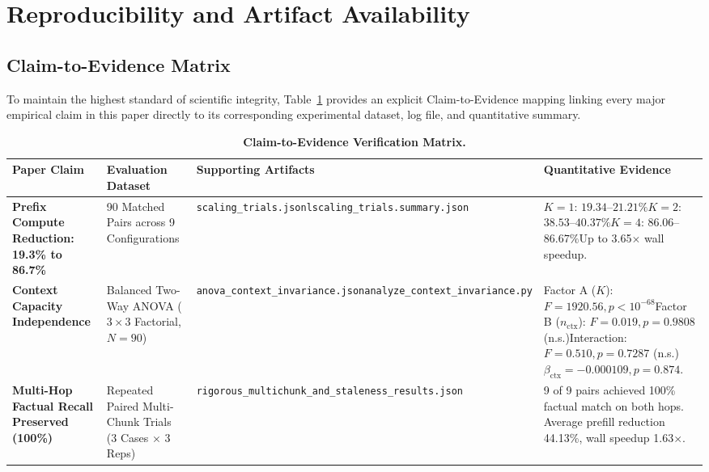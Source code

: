\section{Reproducibility and Artifact Availability}
\label{sec:reproducibility}

\subsection{Claim-to-Evidence Matrix}
To maintain the highest standard of scientific integrity, Table~\ref{tab:claim_matrix} provides an explicit Claim-to-Evidence mapping linking every major empirical claim in this paper directly to its corresponding experimental dataset, log file, and quantitative summary.

\begin{table}[t]
\centering
\caption{\textbf{Claim-to-Evidence Verification Matrix.}}
\label{tab:claim_matrix}
\small
\begin{tabular}{p{3.8cm}p{3.2cm}p{4.2cm}p{4.5cm}}
\toprule
\textbf{Paper Claim} & \textbf{Evaluation Dataset} & \textbf{Supporting Artifacts} & \textbf{Quantitative Evidence} \\
\midrule
\textbf{Prefix Compute Reduction:\newline 19.3\% to 86.7\%} & 90 Matched Pairs across 9 Configurations & \texttt{scaling\_trials.jsonl}\newline \texttt{scaling\_trials.summary.json} & $K=1$: $19.34$--$21.21\%$\newline $K=2$: $38.53$--$40.37\%$\newline $K=4$: $86.06$--$86.67\%$\newline Up to 3.65$\times$ wall speedup. \\
\addlinespace
\textbf{Context Capacity Independence} & Balanced Two-Way ANOVA ($3 \times 3$ Factorial, $N=90$) & \texttt{anova\_context\_invariance.json}\newline \texttt{analyze\_context\_invariance.py} & Factor A ($K$): $F=1920.56, p < 10^{-68}$\newline Factor B ($n_{\text{ctx}}$): $F=0.019, p=0.9808$ (n.s.)\newline Interaction: $F=0.510, p=0.7287$ (n.s.)\newline $\beta_{\text{ctx}} = -0.000109, p=0.874$. \\
\addlinespace
\textbf{Multi-Hop Factual Recall Preserved (100\%)} & Repeated Paired Multi-Chunk Trials (3 Cases $\times$ 3 Reps) & \texttt{rigorous\_multichunk\_and\_}\newline\texttt{staleness\_results.json} & 9 of 9 pairs achieved 100\% factual match on both hops. Average prefill reduction 44.13\%, wall speedup 1.63$\times$. \\

\end{tabular}
\end{table}
